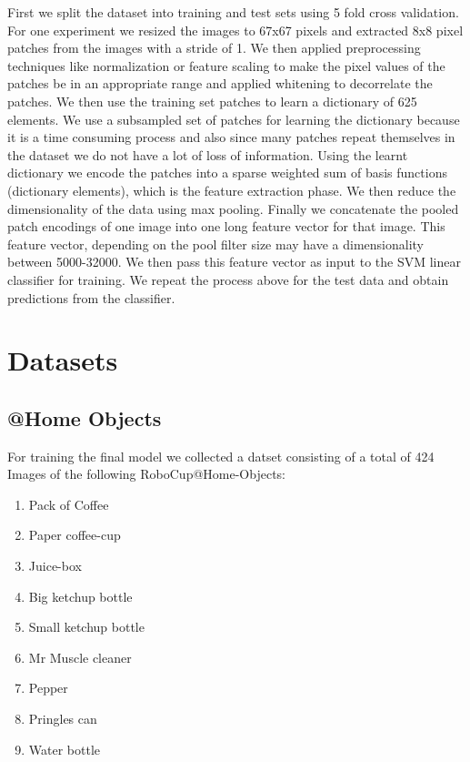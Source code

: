 \documentclass[	DIV=calc,%
				paper=a4,%
				fontsize=11pt,%
				twocolumn]{scrartcl}	 %
\begin{document}
First we split the dataset into training and test sets using 5 fold cross validation. For one experiment we resized the images to 67x67 pixels and extracted 8x8 pixel patches from the images with a stride of 1. We then applied preprocessing techniques like normalization or feature scaling to make the pixel values of the patches be in an appropriate range and applied whitening to decorrelate the patches. We then use the training set patches to learn a dictionary of 625 elements. We use a subsampled set of patches for learning the dictionary because it is a time consuming process and also since many patches repeat themselves in the dataset we do not have a lot of loss of information. Using the learnt dictionary we encode the patches into a sparse weighted sum of basis functions (dictionary elements), which is the feature extraction phase. We then reduce the dimensionality of the data using max pooling. Finally we concatenate the pooled patch encodings of one image into one long feature vector for that image. This feature vector, depending on the pool filter size may have a dimensionality between 5000-32000. We then pass this feature vector as input to the SVM linear classifier for training. We repeat the process above for the test data and obtain predictions from the classifier.


\section{Datasets}
\subsection*{@Home Objects}
For training the final model we collected a datset consisting of a total of 424 Images of the following RoboCup@Home-Objects:
\begin{enumerate}
    \setlength\itemsep{-0.25em}
    \item Pack of Coffee
    \item Paper coffee-cup
    \item Juice-box
    \item Big ketchup bottle
    \item Small ketchup bottle
    \item Mr Muscle cleaner
    \item Pepper
    \item Pringles can
    \item Water bottle
\end{enumerate}
\end{document}
